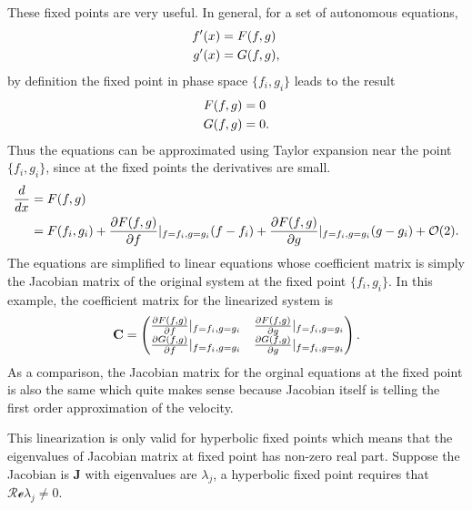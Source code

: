 \documentclass[letterpaper,12pt,english]{sphinxmanual}
\begin{document}
These fixed points are very useful. In general, for a set of autonomous equations,
\begin{gather}
\begin{split}f'(x) & = F(f,g)\\
g'(x) & = G(f,g),\end{split}\notag
\end{gather}
by definition the fixed point in phase space \(\{f_i,g_i\}\) leads to the result
\begin{gather}
\begin{split}F(f,g) & = 0\\
G(f,g) & = 0.\end{split}\notag
\end{gather}
Thus the equations can be approximated using Taylor expansion near the point \(\{f_i,g_i\}\), since at the fixed points the derivatives are small.
\begin{gather}
\begin{split}\frac{d}{dx} &= F(f,g) \\
& = F(f_i,g_i) + \frac{\partial F(f,g)}{\partial f}\vert_{f=f_i,g=g_i} (f-f_i)+ \frac{\partial F(f,g)}{\partial g}\vert_{f=f_i,g=g_i} (g-g_i)+ \mathcal O(2).\end{split}\notag
\end{gather}
The equations are simplified to linear equations whose coefficient matrix is simply the Jacobian matrix of the original system at the fixed point \(\{f_i,g_i \}\). In this example, the coefficient matrix for the linearized system is
\begin{gather}
\begin{split}\mathbf{C} = \begin{pmatrix} \frac{\partial F(f,g)}{\partial f}\vert_{f=f_i,g=g_i} &   \frac{\partial F(f,g)}{\partial g}\vert_{f=f_i,g=g_i}  \\
\frac{\partial G(f,g)}{\partial f}\vert_{f=f_i,g=g_i}  &  \frac{\partial G(f,g)}{\partial g}\vert_{f=f_i,g=g_i}  \end{pmatrix}.\end{split}\notag
\end{gather}
As a comparison, the Jacobian matrix for the orginal equations at the fixed point is also the same which quite makes sense because Jacobian itself is telling the first order approximation of the velocity.

This linearization is only valid for hyperbolic fixed points which means that the eigenvalues of Jacobian matrix at fixed point has non-zero real part. Suppose the Jacobian is \(\mathbf{J}\) with eigenvalues are \(\lambda_j\), a hyperbolic fixed point requires that \(\mathcal{Re}\lambda_j\neq 0\).
\end{document}
